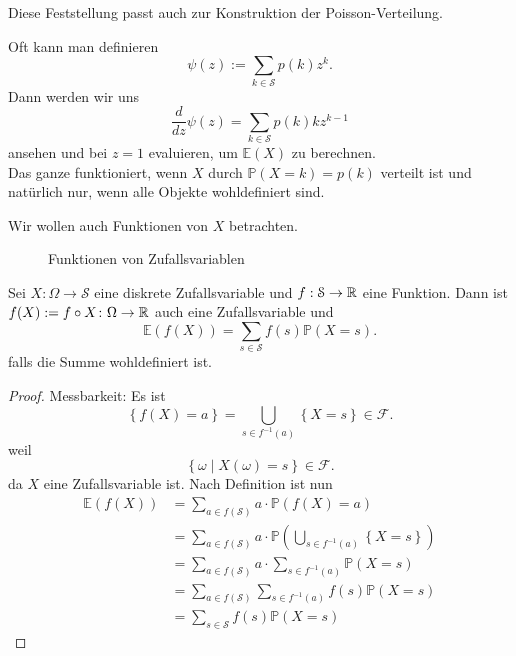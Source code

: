 \begin{remark*}
    Diese Feststellung passt auch zur Konstruktion der Poisson-Verteilung.
\end{remark*}
\begin{remark}
    Oft kann man definieren
    \[
        \psi (z) := \sum_{k\in \mathcal{S}} p(k) z^k
    .\] 
    Dann werden wir uns 
    \[
        \frac{d}{dz}\psi (z) = \sum_{k\in \mathcal{S}} p(k)kz^{k-1}
    \]
    ansehen und bei $z=1$ evaluieren, um  $\mathbb{E}(X)$ zu berechnen. \\
    Das ganze funktioniert, wenn $X$ durch  $\mathbb{P}(X=k) = p(k)$ verteilt ist und natürlich nur, wenn alle Objekte wohldefiniert sind.
\end{remark}
Wir wollen auch Funktionen von $X$ betrachten.
\begin{figure}[ht]
    \centering
    \caption{Funktionen von Zufallsvariablen}
    \label{fig:funktionen-von-zufallsvariablen}
\end{figure}
\begin{theorem}[Transformationssatz]\label{thm:transformationssatz}
    Sei $X:\Omega\to \mathcal{S}$ eine diskrete Zufallsvariable und $f: \mathcal{S} \to  \mathbb{R}$ eine Funktion. Dann ist $f(X) := f \circ  X \colon \Omega\to \mathbb{R}$ auch eine Zufallsvariable und 
    \[
        \mathbb{E}(f(X)) = \sum_{s\in \mathcal{S}} f(s) \mathbb{P}(X=s)
    .\] 
    falls die Summe wohldefiniert ist.
\end{theorem}
\begin{proof}
    Messbarkeit: Es ist
    \[
        \left \{f(X) = a\right\}  = \bigcup_{s\in f^{-1}(a)} \left \{X=s\right\}  \in \mathcal{F}
    .\] 
    weil
    \[
        \left \{\omega \mid  X(\omega) = s\right\} \in \mathcal{F}
    .\] 
    da $X$ eine Zufallsvariable ist. Nach Definition ist nun
    \begin{equation*}
        \begin{split}
            \mathbb{E}(f(X)) &= \sum_{a\in f(\mathcal{S})} a\cdot \mathbb{P}(f(X)=a) \\
                             &= \sum_{a\in f(\mathcal{S})} a\cdot \mathbb{P}\left( \bigcup_{s\in f^{-1}(a)} \left \{X=s\right\}   \right) \\
                             &=\sum_{a\in f(\mathcal{S})} a\cdot \sum_{s\in f^{-1}(a)} \mathbb{P}(X=s) \\
                             &=\sum_{a\in f(\mathcal{S})} \sum_{s\in f^{-1}(a)} f(s) \mathbb{P}(X=s) \\
                             &= \sum_{s\in \mathcal{S}} f(s) \mathbb{P}(X=s)
        \end{split}
    \end{equation*}
\end{proof}

